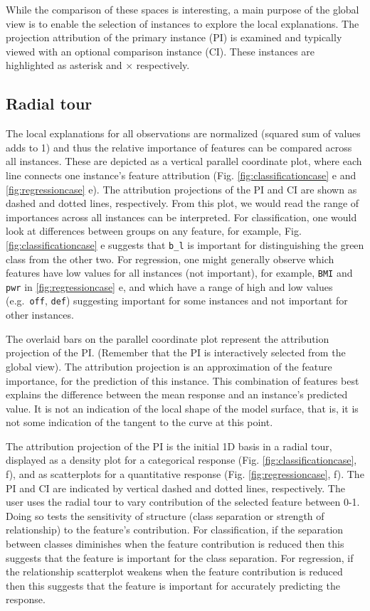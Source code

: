 \documentclass[
]{article}
\begin{document}
While the comparison of these spaces is interesting, a main purpose of the global view is to enable the selection of instances to explore the local explanations. The projection attribution of the primary instance (PI) is examined and typically viewed with an optional comparison instance (CI). These instances are highlighted as asterisk and \(\times\) respectively.

\hypertarget{radial-tour}{%
\subsection{Radial tour}\label{radial-tour}}

The local explanations for all observations are normalized (squared sum of values adds to 1) and thus the relative importance of features can be compared across all instances. These are depicted as a vertical parallel coordinate plot, where each line connects one instance's feature attribution (Fig. \ref{fig:classificationcase} e and \ref{fig:regressioncase} e). The attribution projections of the PI and CI are shown as dashed and dotted lines, respectively. From this plot, we would read the range of importances across all instances can be interpreted. For classification, one would look at differences between groups on any feature, for example, Fig. \ref{fig:classificationcase} e suggests that \texttt{b\_l} is important for distinguishing the green class from the other two. For regression, one might generally observe which features have low values for all instances (not important), for example, \texttt{BMI} and \texttt{pwr} in \ref{fig:regressioncase} e, and which have a range of high and low values (e.g.~\texttt{off}, \texttt{def}) suggesting important for some instances and not important for other instances.

The overlaid bars on the parallel coordinate plot represent the attribution projection of the PI. (Remember that the PI is interactively selected from the global view). The attribution projection is an approximation of the feature importance, for the prediction of this instance. This combination of features best explains the difference between the mean response and an instance's predicted value. It is not an indication of the local shape of the model surface, that is, it is not some indication of the tangent to the curve at this point.

The attribution projection of the PI is the initial 1D basis in a radial tour, displayed as a density plot for a categorical response (Fig. \ref{fig:classificationcase}, f), and as scatterplots for a quantitative response (Fig. \ref{fig:regressioncase}, f). The PI and CI are indicated by vertical dashed and dotted lines, respectively. The user uses the radial tour to vary contribution of the selected feature between 0-1. Doing so tests the sensitivity of structure (class separation or strength of relationship) to the feature's contribution. For classification, if the separation between classes diminishes when the feature contribution is reduced then this suggests that the feature is important for the class separation. For regression, if the relationship scatterplot weakens when the feature contribution is reduced then this suggests that the feature is important for accurately predicting the response.
\end{document}
